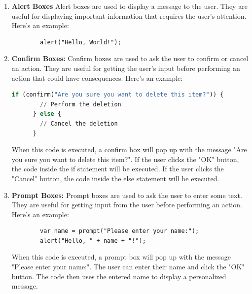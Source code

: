 \documentclass[11pt]{article}
\begin{document}
\begin{enumerate}
    \item \textbf{Alert Boxes} Alert boxes are used to display a message to the user. They are useful for displaying important information that requires the user's attention. Here's an example:
    \begin{lstlisting}
        alert("Hello, World!");   
    \end{lstlisting}
    \item \textbf{Confirm Boxes:}
    Confirm boxes are used to ask the user to confirm or cancel an action. They are useful for getting the user's input before performing an action that could have consequences. Here's an example:
    \begin{lstlisting}[language=python]
        if (confirm("Are you sure you want to delete this item?")) {
        // Perform the deletion
      } else {
        // Cancel the deletion
      }
    \end{lstlisting}
    When this code is executed, a confirm box will pop up with the message "Are you sure you want to delete this item?". If the user clicks the "OK" button, the code inside the if statement will be executed. If the user clicks the "Cancel" button, the code inside the else statement will be executed.
    \item \textbf{Prompt Boxes:}
    Prompt boxes are used to ask the user to enter some text. They are useful for getting input from the user before performing an action. Here's an example:
    \begin{lstlisting}
        var name = prompt("Please enter your name:");
        alert("Hello, " + name + "!");
    \end{lstlisting}
    When this code is executed, a prompt box will pop up with the message "Please enter your name:". The user can enter their name and click the "OK" button. The code then uses the entered name to display a personalized message.
\end{enumerate}
\end{document}
